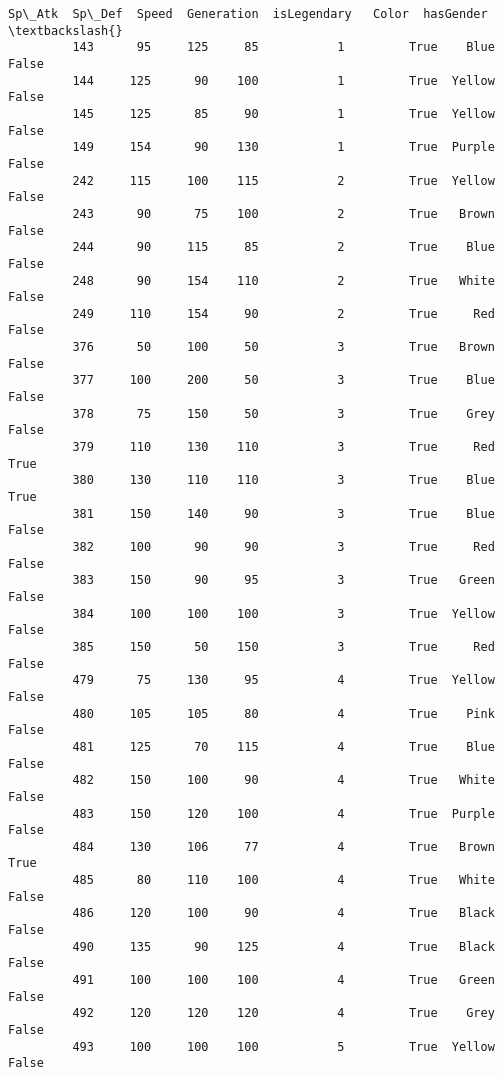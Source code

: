 \documentclass[11pt]{article}
\begin{document}
\begin{Verbatim}[commandchars=\\\{\}]
              Sp\_Atk  Sp\_Def  Speed  Generation  isLegendary   Color  hasGender  \textbackslash{}
         143      95     125     85           1         True    Blue      False   
         144     125      90    100           1         True  Yellow      False   
         145     125      85     90           1         True  Yellow      False   
         149     154      90    130           1         True  Purple      False   
         242     115     100    115           2         True  Yellow      False   
         243      90      75    100           2         True   Brown      False   
         244      90     115     85           2         True    Blue      False   
         248      90     154    110           2         True   White      False   
         249     110     154     90           2         True     Red      False   
         376      50     100     50           3         True   Brown      False   
         377     100     200     50           3         True    Blue      False   
         378      75     150     50           3         True    Grey      False   
         379     110     130    110           3         True     Red       True   
         380     130     110    110           3         True    Blue       True   
         381     150     140     90           3         True    Blue      False   
         382     100      90     90           3         True     Red      False   
         383     150      90     95           3         True   Green      False   
         384     100     100    100           3         True  Yellow      False   
         385     150      50    150           3         True     Red      False   
         479      75     130     95           4         True  Yellow      False   
         480     105     105     80           4         True    Pink      False   
         481     125      70    115           4         True    Blue      False   
         482     150     100     90           4         True   White      False   
         483     150     120    100           4         True  Purple      False   
         484     130     106     77           4         True   Brown       True   
         485      80     110    100           4         True   White      False   
         486     120     100     90           4         True   Black      False   
         490     135      90    125           4         True   Black      False   
         491     100     100    100           4         True   Green      False   
         492     120     120    120           4         True    Grey      False   
         493     100     100    100           5         True  Yellow      False   

\end{Verbatim}
\end{document}
